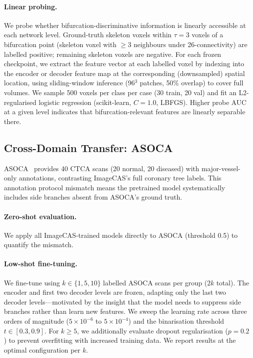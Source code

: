 \documentclass[runningheads]{llncs}
\begin{document}
\paragraph{Linear probing.}
We probe whether bifurcation-discriminative information is linearly accessible at each network level.
Ground-truth skeleton voxels within $\tau{=}3$ voxels of a bifurcation point (skeleton voxel with ${\geq}3$ neighbours under 26-connectivity) are labelled positive; remaining skeleton voxels are negative.
For each frozen checkpoint, we extract the feature vector at each labelled voxel by indexing into the encoder or decoder feature map at the corresponding (downsampled) spatial location, using sliding-window inference (96$^3$ patches, 50\% overlap) to cover full volumes.
We sample 500 voxels per class per case (30 train, 20 val) and fit an L2-regularised logistic regression (scikit-learn, $C{=}1.0$, LBFGS).
Higher probe AUC at a given level indicates that bifurcation-relevant features are linearly separable there.

\subsection{Cross-Domain Transfer: ASOCA}
\label{sec:asoca}

ASOCA~\cite{gharleghi_asoca_2022} provides 40 CTCA scans (20 normal, 20 diseased) with major-vessel-only annotations, contrasting ImageCAS's full coronary tree labels.
This annotation protocol mismatch means the pretrained model systematically includes side branches absent from ASOCA's ground truth.

\paragraph{Zero-shot evaluation.}
We apply all ImageCAS-trained models directly to ASOCA (threshold 0.5) to quantify the mismatch.

\paragraph{Low-shot fine-tuning.}
We fine-tune using $k \in \{1, 5, 10\}$ labelled ASOCA scans per group ($2k$ total).
The encoder and first two decoder levels are frozen, adapting only the last two decoder levels---motivated by the insight that the model needs to suppress side branches rather than learn new features.
We sweep the learning rate across three orders of magnitude ($5{\times}10^{-6}$ to $5{\times}10^{-4}$) and the binarisation threshold $t \in [0.3, 0.9]$.
For $k{\geq}5$, we additionally evaluate dropout regularisation ($p{=}0.2$) to prevent overfitting with increased training data.
We report results at the optimal configuration per $k$.
\end{document}
